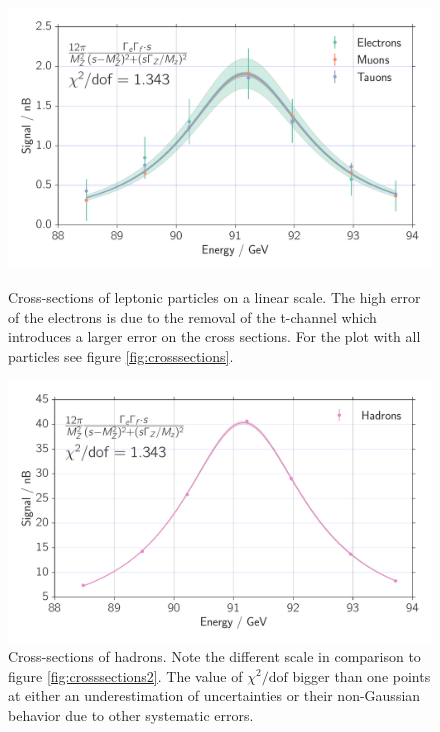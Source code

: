 \begin{figure}[htpb]
    \centering
    \includegraphics[width=1.0\linewidth]{figures/crosssections2}
    \caption{Cross-sections of leptonic particles on a linear scale. 
        The high error of the electrons is due to the removal of the t-channel which introduces 
        a larger error on the cross sections. 
        For the plot with all particles see figure \ref{fig:crosssections}.
    }
    \label{fig:crosssections2}
    \includegraphics[width=1.0\linewidth]{figures/crosssections_h}
    \caption{Cross-sections of hadrons. Note the different scale in comparison to figure \ref{fig:crosssections2}.
    The value of $\chi^2/\mathrm{dof}$ bigger than one points at either an underestimation
    of uncertainties or their non-Gaussian behavior due to other systematic errors.}
    \label{fig:crosssections_h}
\end{figure}

